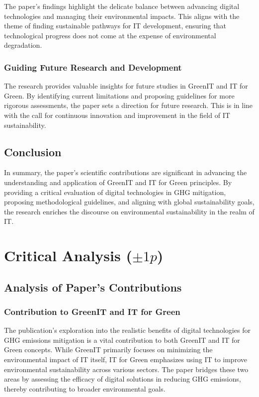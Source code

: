 \documentclass[conference,compsoc]{IEEEtran}
\begin{document}
The paper's findings highlight the delicate balance between advancing digital technologies and managing their environmental impacts. This aligns with the  theme of finding sustainable pathways for IT development, ensuring that technological progress does not come at the expense of environmental degradation.

\subsubsection{Guiding Future Research and Development}

The research provides valuable insights for future studies in GreenIT and IT for Green. By identifying current limitations and proposing guidelines for more rigorous assessments, the paper sets a direction for future research. This is in line with the  call for continuous innovation and improvement in the field of IT sustainability.

\subsection{Conclusion}

In summary, the paper's scientific contributions are significant in advancing the understanding and application of GreenIT and IT for Green principles. By providing a critical evaluation of digital technologies in GHG mitigation, proposing methodological guidelines, and aligning with global sustainability goals, the research enriches the discourse on environmental sustainability in the realm of IT.

\section{Critical Analysis ($\pm 1p$)}

\subsection{Analysis of Paper's Contributions}

\subsubsection{Contribution to GreenIT and IT for Green}

The publication's exploration into the realistic benefits of digital technologies for GHG emissions mitigation is a vital contribution to both GreenIT and IT for Green concepts. While GreenIT primarily focuses on minimizing the environmental impact of IT itself, IT for Green emphasizes using IT to improve environmental sustainability across various sectors. The paper bridges these two areas by assessing the efficacy of digital solutions in reducing GHG emissions, thereby contributing to broader environmental goals.
\end{document}

